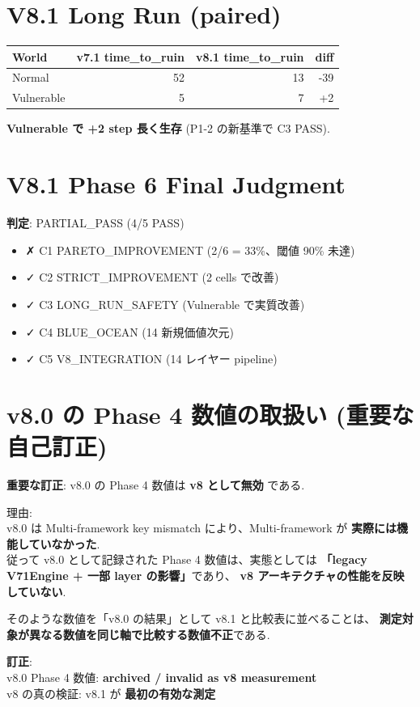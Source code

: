 \documentclass[a4paper,11pt]{report}
\begin{document}
\section{V8.1 Long Run (paired)}

\begin{longtable}{l r r r}
\toprule
World & v7.1 time\_to\_ruin & v8.1 time\_to\_ruin & diff \\
\midrule
Normal & 52 & 13 & \textcolor{warning}{-39} \\
Vulnerable & 5 & 7 & \textcolor{success}{+2} \\
\bottomrule
\end{longtable}

\textbf{Vulnerable で +2 step 長く生存} (P1-2 の新基準で C3 PASS).

\section{V8.1 Phase 6 Final Judgment}

\begin{summary}
\textbf{判定}: PARTIAL\_PASS (4/5 PASS)

\begin{itemize}[leftmargin=*]
  \item \textcolor{warning}{✗ C1 PARETO\_IMPROVEMENT (2/6 = 33\%、閾値 90\% 未達)}
  \item \textcolor{success}{✓ C2 STRICT\_IMPROVEMENT (2 cells で改善)}
  \item \textcolor{success}{✓ C3 LONG\_RUN\_SAFETY (Vulnerable で実質改善)}
  \item \textcolor{success}{✓ C4 BLUE\_OCEAN (14 新規価値次元)}
  \item \textcolor{success}{✓ C5 V8\_INTEGRATION (14 レイヤー pipeline)}
\end{itemize}
\end{summary}

\section{v8.0 の Phase 4 数値の取扱い (重要な自己訂正)}

\begin{critical}
\textbf{重要な訂正}: v8.0 の Phase 4 数値は \textbf{v8 として無効} である.

理由:\\
v8.0 は Multi-framework key mismatch により、Multi-framework が
\textbf{実際には機能していなかった}.\\
従って v8.0 として記録された Phase 4 数値は、実態としては
\textbf{「legacy V71Engine + 一部 layer の影響」}であり、
\textbf{v8 アーキテクチャの性能を反映していない}.

そのような数値を「v8.0 の結果」として v8.1 と比較表に並べることは、
\textbf{測定対象が異なる数値を同じ軸で比較する数値不正}である.

\textbf{訂正}:\\
v8.0 Phase 4 数値: \textbf{archived / invalid as v8 measurement}\\
v8 の真の検証: v8.1 が \textbf{最初の有効な測定}
\end{critical}
\end{document}
